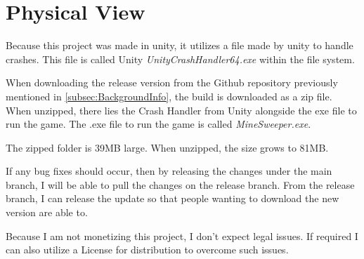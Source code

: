 \section{Physical View}
\label{sec:PhysView}

Because this project was made in unity, it utilizes a file made by unity to handle crashes.
This file is called Unity \textit{UnityCrashHandler64.exe} within the file system.

When downloading the release version from the Github repository previously mentioned in \ref{subsec:BackgroundInfo}, the build is downloaded as a zip file.
When unzipped, there lies the Crash Handler from Unity alongside the exe file to run the game.
The .exe file to run the game is called \textit{MineSweeper.exe}.

The zipped folder is 39MB large.
When unzipped, the size grows to 81MB.

If any bug fixes should occur, then by releasing the changes under the main branch, I will be able to pull the changes on the release branch.
From the release branch, I can release the update so that people wanting to download the new version are able to.

Because I am not monetizing this project, I don't expect legal issues.
If required I can also utilize a License for distribution to overcome such issues.